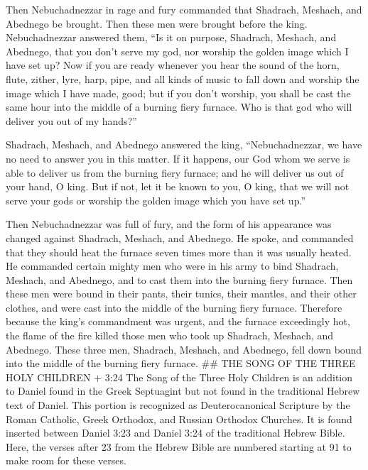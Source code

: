  Then Nebuchadnezzar in rage and fury commanded that
Shadrach, Meshach, and Abednego be brought. Then these men were brought
before the king.  Nebuchadnezzar answered them, ``Is it on
purpose, Shadrach, Meshach, and Abednego, that you don't serve my god,
nor worship the golden image which I have set up?  Now if
you are ready whenever you hear the sound of the horn, flute, zither,
lyre, harp, pipe, and all kinds of music to fall down and worship the
image which I have made, good; but if you don't worship, you shall be
cast the same hour into the middle of a burning fiery furnace. Who is
that god who will deliver you out of my hands?''

 Shadrach, Meshach, and Abednego answered the king,
``Nebuchadnezzar, we have no need to answer you in this matter.
 If it happens, our God whom we serve is able to deliver us
from the burning fiery furnace; and he will deliver us out of your hand,
O king.  But if not, let it be known to you, O king, that
we will not serve your gods or worship the golden image which you have
set up.''

 Then Nebuchadnezzar was full of fury, and the form of his
appearance was changed against Shadrach, Meshach, and Abednego. He
spoke, and commanded that they should heat the furnace seven times more
than it was usually heated.  He commanded certain mighty
men who were in his army to bind Shadrach, Meshach, and Abednego, and to
cast them into the burning fiery furnace.  Then these men
were bound in their pants, their tunics, their mantles, and their other
clothes, and were cast into the middle of the burning fiery furnace.
 Therefore because the king's commandment was urgent, and
the furnace exceedingly hot, the flame of the fire killed those men who
took up Shadrach, Meshach, and Abednego.  These three men,
Shadrach, Meshach, and Abednego, fell down bound into the middle of the
burning fiery furnace. \#\# THE SONG OF THE THREE HOLY CHILDREN + 3:24
The Song of the Three Holy Children is an addition to Daniel found in
the Greek Septuagint but not found in the traditional Hebrew text of
Daniel. This portion is recognized as Deuterocanonical Scripture by the
Roman Catholic, Greek Orthodox, and Russian Orthodox Churches. It is
found inserted between Daniel 3:23 and Daniel 3:24 of the traditional
Hebrew Bible. Here, the verses after 23 from the Hebrew Bible are
numbered starting at 91 to make room for these verses.

